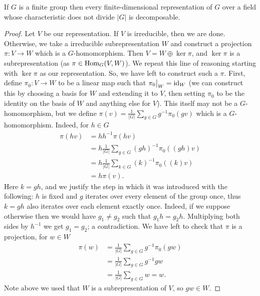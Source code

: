 \begin{theorem}[Maschke's]
  If $G$ is a finite group then every finite-dimensional representation of $G$ over a field whose characteristic does not divide $\lvert G \rvert$ is decomposable.
\end{theorem}

\begin{proof}
  Let $V$ be our representation. If $V$ is irreducible, then we are done. Otherwise, we take a irreducible subrepresentation $W$ and construct a projection $\pi: V \to W$ which is a $G$-homomorphism. Then $V = W \oplus \ker\pi$, and $\ker\pi$ is a subrepresentation (as $\pi \in \operatorname{Hom}_G(V,W)$). We repeat this line of reasoning starting with $\ker\pi$ as our representation. So, we have left to construct such a $\pi$. First, define $\pi_0: V \to W$ to be a linear map such that $\restr{\pi_0}{W} = \id_W$ (we can construct this by choosing a basis for $W$ and extending it to $V$, then setting $\pi_0$ to be the identity on the basis of $W$ and anything else for $V$). This itself may not be a $G$-homomorphism, but we define $\pi(v) = \frac1{\lvert G \rvert} \sum_{g \in G} g^{-1} \pi_0(gv)$ which is a $G$-homomorphism. Indeed, for $h \in G$
  \begin{align*}
    \pi(hv)
     & = hh^{-1} \pi(hv)                                                 \\
     & = h \frac1{\lvert G \rvert} \sum_{g \in G} (gh)^{-1} \pi_0((gh)v) \\
     & = h \frac1{\lvert G \rvert} \sum_{k \in G} (k)^{-1} \pi_0((k)v)   \\
     & = h\pi(v).
  \end{align*}
  Here $k = gh$, and we justify the step in which it was introduced with the following: $h$ is fixed and $g$ iterates over every element of the group once, thus $k=gh$ also iterates over each element exactly once. Indeed, if we suppose otherwise then we would have $g_1 \neq g_2$ such that $g_1h = g_2h$. Multiplying both sides by $h^{-1}$ we get $g_1 = g_2$; a contradiction. We have left to check that $\pi$ is a projection, for $w \in W$
  \begin{align*}
    \pi(w)
     & = \frac1{\lvert G \rvert} \sum_{g \in G} g^{-1}\pi_0(gw) \\
     & = \frac1{\lvert G \rvert} \sum_{g \in G} g^{-1} gw       \\
     & = \frac1{\lvert G \rvert} \sum_{g \in G} w = w.
  \end{align*}
  Note above we used that $W$ is a subrepresentation of $V$, so $gw \in W$.
\end{proof}

